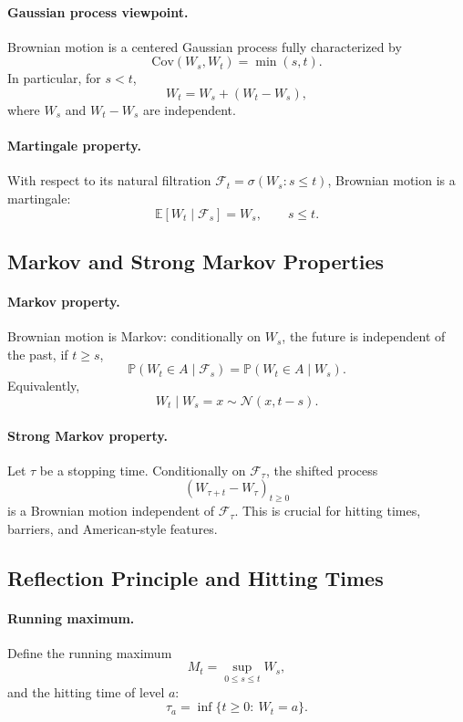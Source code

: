 \documentclass[11pt]{article}
\newcommand{\Pbb}{\mathbb{P}}
\newcommand{\E}{\mathbb{E}}
\newcommand{\Cov}{\mathrm{Cov}}
\newcommand{\1}{\mathbf{1}}
\theoremstyle{plain}
\theoremstyle{definition}
\theoremstyle{remark}
\begin{document}
\paragraph{Gaussian process viewpoint.}
Brownian motion is a centered Gaussian process fully characterized by
\[
\Cov(W_s,W_t)=\min(s,t).
\]
In particular, for $s<t$,
\[
W_t=W_s+(W_t-W_s),
\]
where $W_s$ and $W_t-W_s$ are independent.

\paragraph{Martingale property.}
With respect to its natural filtration $\mathcal F_t=\sigma(W_s:s\le t)$,
Brownian motion is a martingale:
\[
\E[W_t\mid\mathcal F_s]=W_s,\qquad s\le t.
\]

\subsection{Markov and Strong Markov Properties}

\paragraph{Markov property.}
Brownian motion is Markov: conditionally on $W_s$,
the future is independent of the past,  if $t \geq s$, 
\[
\Pbb(W_t\in A\mid\mathcal F_s)=\Pbb(W_t\in A\mid W_s).
\]
Equivalently,
\[
W_t\mid W_s=x \sim \mathcal N(x,t-s).
\]

\paragraph{Strong Markov property.}
Let $\tau$ be a stopping time.
Conditionally on $\mathcal F_\tau$, the shifted process
\[
(W_{\tau+t}-W_\tau)_{t\ge0}
\]
is a Brownian motion independent of $\mathcal F_\tau$.
This is crucial for hitting times, barriers, and American-style features.

\subsection{Reflection Principle and Hitting Times}

\paragraph{Running maximum.}
Define the running maximum
\[
M_t=\sup_{0\le s\le t} W_s,
\]
and the hitting time of level $a$:
\[
\tau_a=\inf\{t\ge0:\ W_t=a\}.
\]
\end{document}
